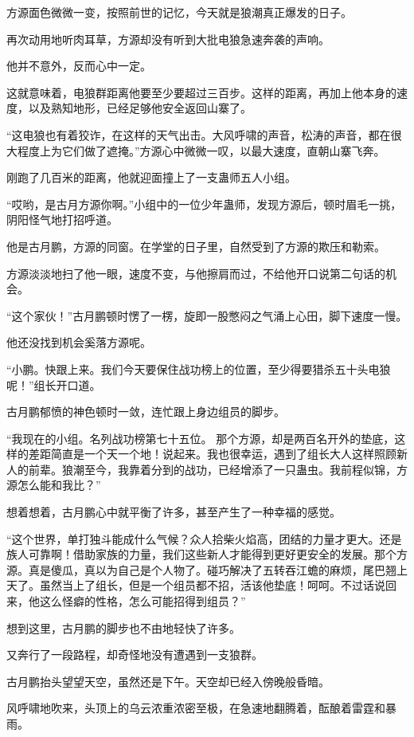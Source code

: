 \begin{this_body}
方源面色微微一变，按照前世的记忆，今天就是狼潮真正爆发的日子。

再次动用地听肉耳草，方源却没有听到大批电狼急速奔袭的声响。

他并不意外，反而心中一定。

这就意味着，电狼群距离他要至少要超过三百步。这样的距离，再加上他本身的速度，以及熟知地形，已经足够他安全返回山寨了。

“这电狼也有着狡诈，在这样的天气出击。大风呼啸的声音，松涛的声音，都在很大程度上为它们做了遮掩。”方源心中微微一叹，以最大速度，直朝山寨飞奔。

刚跑了几百米的距离，他就迎面撞上了一支蛊师五人小组。

“哎哟，是古月方源你啊。”小组中的一位少年蛊师，发现方源后，顿时眉毛一挑，阴阳怪气地打招呼道。

他是古月鹏，方源的同窗。在学堂的日子里，自然受到了方源的欺压和勒索。

方源淡淡地扫了他一眼，速度不变，与他擦肩而过，不给他开口说第二句话的机会。

“这个家伙！”古月鹏顿时愣了一楞，旋即一股憋闷之气涌上心田，脚下速度一慢。

他还没找到机会奚落方源呢。

“小鹏。快跟上来。我们今天要保住战功榜上的位置，至少得要猎杀五十头电狼呢！”组长开口道。

古月鹏郁愤的神色顿时一敛，连忙跟上身边组员的脚步。

“我现在的小组。名列战功榜第七十五位。 那个方源，却是两百名开外的垫底，这样的差距简直是一个天一个地！说起来。我也很幸运，遇到了组长大人这样照顾新人的前辈。狼潮至今，我靠着分到的战功，已经增添了一只蛊虫。我前程似锦，方源怎么能和我比？”

想着想着，古月鹏心中就平衡了许多，甚至产生了一种幸福的感觉。

“这个世界，单打独斗能成什么气候？众人拾柴火焰高，团结的力量才更大。还是族人可靠啊！借助家族的力量，我们这些新人才能得到更好更安全的发展。那个方源。真是傻瓜，真以为自己是个人物了。碰巧解决了五转吞江蟾的麻烦，尾巴翘上天了。虽然当上了组长，但是一个组员都不招，活该他垫底！呵呵。不过话说回来，他这么怪癖的性格，怎么可能招得到组员？”

想到这里，古月鹏的脚步也不由地轻快了许多。

又奔行了一段路程，却奇怪地没有遭遇到一支狼群。

古月鹏抬头望望天空，虽然还是下午。天空却已经入傍晚般昏暗。

风呼啸地吹来，头顶上的乌云浓重浓密至极，在急速地翻腾着，酝酿着雷霆和暴雨。


\end{this_body}
